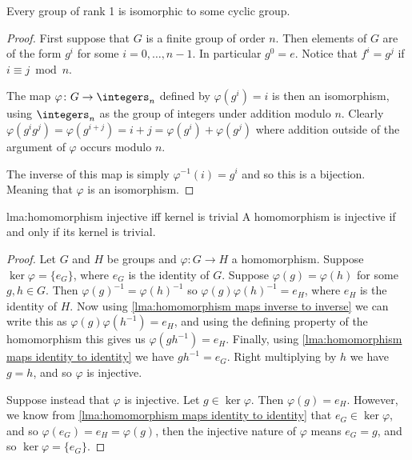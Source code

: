 \begin{lma}{}{}
    Every group of rank 1 is isomorphic to some cyclic group.
    
    \begin{proof}
        First suppose that \(G\) is a finite group of order \(n\).
        Then elements of \(G\) are of the form \(g^i\) for some \(i = 0, \dotsc, n - 1\).
        In particular \(g^0 = e\).
        Notice that \(f^i = g^j\) if \(i \equiv j \bmod n\).
        
        The map \(\varphi\colon G \to \integers_n\) defined by \(\varphi(g^i) = i\) is then an isomorphism, using \(\integers_n\) as the group of integers under addition modulo \(n\).
        Clearly \(\varphi(g^{i}g^{j}) = \varphi(g^{i + j}) = i + j = \varphi(g^i) + \varphi(g^j)\) where addition outside of the argument of \(\varphi\) occurs modulo \(n\).
        
        The inverse of this map is simply \(\varphi^{-1}(i) = g^i\) and so this is a bijection.
        Meaning that \(\varphi\) is an isomorphism.
    \end{proof}
\end{lma}

\begin{lma}{}{lma:homomorphism injective iff kernel is trivial}
    A homomorphism is injective if and only if its kernel is trivial.
    \begin{proof}
        Let \(G\) and \(H\) be groups and \(\varphi \colon G \to H\) a homomorphism.
        Suppose \(\ker\varphi = \{e_G\}\), where \(e_{G}\) is the identity of \(G\).
        Suppose \(\varphi(g) = \varphi(h)\) for some \(g, h \in G\).
        Then \(\varphi(g)^{-1} = \varphi(h)^{-1}\) so \(\varphi(g)\varphi(h)^{-1} = e_{H}\), where \(e_{H}\) is the identity of \(H\).
        Now using \cref{lma:homomorphism maps inverse to inverse} we can write this as \(\varphi(g)\varphi(h^{-1}) = e_H\), and using the defining property of the homomorphism this gives us \(\varphi(gh^{-1}) = e_H\).
        Finally, using \cref{lma:homomorphism maps identity to identity} we have \(gh^{-1} = e_G\).
        Right multiplying by \(h\) we have \(g = h\), and so \(\varphi\) is injective.
        
        Suppose instead that \(\varphi\) is injective.
        Let \(g \in \ker\varphi\).
        Then \(\varphi(g) = e_H\).
        However, we know from \cref{lma:homomorphism maps identity to identity} that \(e_G \in \ker\varphi\), and so \(\varphi(e_G) = e_H = \varphi(g)\), then the injective nature of \(\varphi\) means \(e_G = g\), and so \(\ker\varphi = \{e_G\}\).
    \end{proof}
\end{lma}

